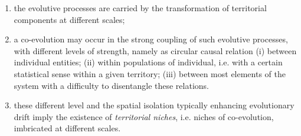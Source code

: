 \documentclass[11pt]{article}
\newcommand{\noun}[1]{\textsc{#1}}
\begin{document}
\begin{enumerate}
    \item the evolutive processes are carried by the transformation of territorial components at different scales;
	\item a co-evolution may occur in the strong coupling of such evolutive processes, with different levels of strength, namely as circular causal relation (i) between individual entities; (ii) within populations of individual, i.e. with a certain statistical sense within a given territory; (iii) between most elements of the system with a difficulty to disentangle these relations.
	\item these different level and the spatial isolation typically enhancing evolutionary drift imply the existence of \emph{territorial niches}, i.e. niches of co-evolution, imbricated at different scales.
\end{enumerate}
\end{document}
